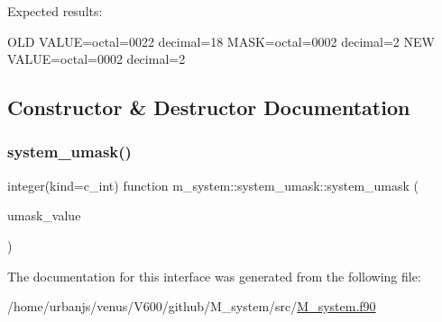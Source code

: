 Expected results\+:

O\+LD V\+A\+L\+UE=octal=0022 decimal=18 M\+A\+SK=octal=0002 decimal=2 N\+EW V\+A\+L\+UE=octal=0002 decimal=2 

\subsection{Constructor \& Destructor Documentation}
\mbox{\label{interfacem__system_1_1system__umask_a10fa518062761065afc422f100ed0a76}} 
\subsubsection{\texorpdfstring{system\+\_\+umask()}{system\_umask()}}
{\footnotesize\ttfamily integer(kind=c\+\_\+int) function m\+\_\+system\+::system\+\_\+umask\+::system\+\_\+umask (\begin{DoxyParamCaption}\item[{integer(kind=c\+\_\+int), value}]{umask\+\_\+value }\end{DoxyParamCaption})\hspace{0.3cm}{\ttfamily [private]}}



The documentation for this interface was generated from the following file\+:\begin{DoxyCompactItemize}
\item 
/home/urbanjs/venus/\+V600/github/\+M\+\_\+system/src/\mbox{\hyperlink{M__system_8f90}{M\+\_\+system.\+f90}}\end{DoxyCompactItemize}

